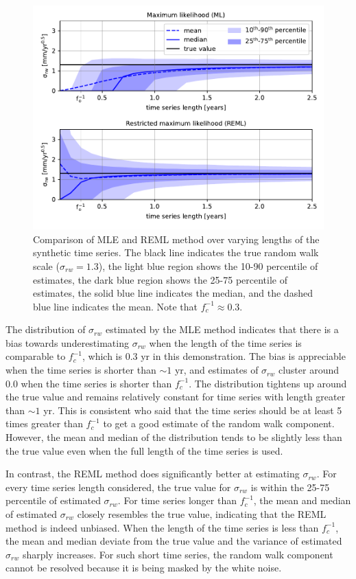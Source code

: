 \documentclass[10pt,a4paper]{article}
\begin{document}
\begin{figure}
\includegraphics[scale=1.0]{figure_1.pdf}
\caption{Comparison of MLE and REML method over varying lengths of the synthetic time series. The black line indicates the true random walk scale ($\sigma_{rw}=1.3$), the light blue region shows the 10-90 percentile of estimates, the dark blue region shows the 25-75 percentile of estimates, the solid blue line indicates the median, and the dashed blue line indicates the mean. Note that $f_c^{-1} \approx 0.3$.}   
\label{fig:EstimateRW}
\end{figure}

The distribution of $\sigma_{rw}$ estimated by the MLE method indicates that there is a bias towards underestimating $\sigma_{rw}$ when the length of the time series is comparable to $f_c^{-1}$, which is 0.3 yr in this demonstration. The bias is appreciable when the time series is shorter than ${\sim}1$ yr, and estimates of $\sigma_{rw}$ cluster around 0.0 when the time series is shorter than $f_c^{-1}$. The distribution tightens up around the true value and remains relatively constant for time series with length greater than ${\sim}1$ yr. This is consistent \citet{Langbein1997} who said that the time series should be at least 5 times greater than $f_c^{-1}$ to get a good estimate of the random walk component. However, the mean and median of the distribution tends to be slightly less than the true value even when the full length of the time series is used.

In contrast, the REML method does significantly better at estimating $\sigma_{rw}$. For every time series length considered, the true value for $\sigma_{rw}$ is within the 25-75 percentile of estimated $\sigma_{rw}$. For time series longer than $f_c^{-1}$, the mean and median of estimated $\sigma_{rw}$ closely resembles the true value, indicating that the REML method is indeed unbiased. When the length of the time series is less than $f_c^{-1}$, the mean and median deviate from the true value and the variance of estimated $\sigma_{rw}$ sharply increases. For such short time series, the random walk component cannot be resolved because it is being masked by the white noise. 
  
\end{document}

